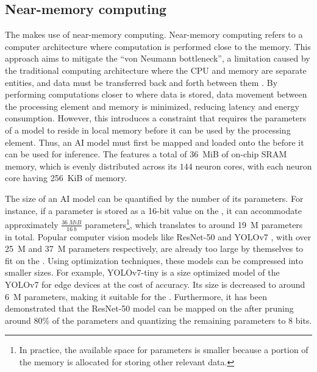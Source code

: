 \subsection{Near-memory computing}
The \graicore{} makes use of near-memory computing.
Near-memory computing refers to a computer architecture where computation is performed close to the memory.
This approach aims to mitigate the ``von Neumann bottleneck'', a limitation caused by the traditional computing architecture where the CPU and memory are separate entities, and data must be transferred back and forth between them \cite{indiveriMemoryInformationProcessing2015}.
By performing computations closer to where data is stored, data movement between the processing element and memory is minimized, reducing latency and energy consumption.
However, this introduces a constraint that requires the parameters of a model to reside in local memory before it can be used by the processing element.
Thus, an AI model must first be mapped and loaded onto the \graicore{} before it can be used for inference.
The \graicore{} features a total of \SI{36}{MiB} of on-chip SRAM memory, which is evenly distributed across its $144$ neuron cores, with each neuron core having \SI{256}{KiB} of memory.

The size of an AI model can be quantified by the number of its parameters.
For instance, if a parameter is stored as a 16-bit value on the \graicore{}, it can accommodate approximately $\frac{\SI{36}{MiB}}{\SI{16}{b}}$ parameters\footnote{In practice, the available space for parameters is smaller because a portion of the memory is allocated for storing other relevant data.}, which translates to around \SI{19}{M} parameters in total.
Popular computer vision models like ResNet-50 \cite{heDeepResidualLearning2015} and YOLOv7 \cite{wangYOLOv7TrainableBagoffreebies2022}, with over \SI{25}{M} and \SI{37}{M} parameters respectively, are already too large by themselves to fit on the \graicore{}.
Using optimization techniques, these models can be compressed into smaller sizes.
For example, YOLOv7-tiny \cite{wangYOLOv7TrainableBagoffreebies2022} is a size optimized model of the YOLOv7 for edge devices at the cost of accuracy.
Its size is decreased to around \SI{6}{M} parameters, making it suitable for the \graicore{}.
Furthermore, it has been demonstrated that the ResNet-50 model can be mapped on the \graicore{} after pruning around 80\% of the parameters and quantizing the remaining parameters to 8 bits.

